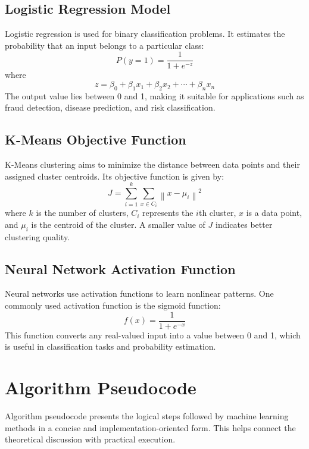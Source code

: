 \documentclass[11pt,a4paper]{article}
\begin{document}
\subsection{Logistic Regression Model}

Logistic regression is used for binary classification problems. It estimates the probability that an input belongs to a particular class:
\[
P(y=1)=\frac{1}{1+e^{-z}}
\]
where
\[
z = \beta_0 + \beta_1x_1 + \beta_2x_2 + \cdots + \beta_nx_n
\]
The output value lies between 0 and 1, making it suitable for applications such as fraud detection, disease prediction, and risk classification.

\subsection{K-Means Objective Function}

K-Means clustering aims to minimize the distance between data points and their assigned cluster centroids. Its objective function is given by:
\[
J = \sum_{i=1}^{k} \sum_{x \in C_i} \left\|x-\mu_i\right\|^2
\]
where $k$ is the number of clusters, $C_i$ represents the $i$th cluster, $x$ is a data point, and $\mu_i$ is the centroid of the cluster. A smaller value of $J$ indicates better clustering quality.

\subsection{Neural Network Activation Function}

Neural networks use activation functions to learn nonlinear patterns. One commonly used activation function is the sigmoid function:
\[
f(x)=\frac{1}{1+e^{-x}}
\]
This function converts any real-valued input into a value between 0 and 1, which is useful in classification tasks and probability estimation.


\section{Algorithm Pseudocode}

Algorithm pseudocode presents the logical steps followed by machine learning methods in a concise and implementation-oriented form. This helps connect the theoretical discussion with practical execution.
\end{document}
